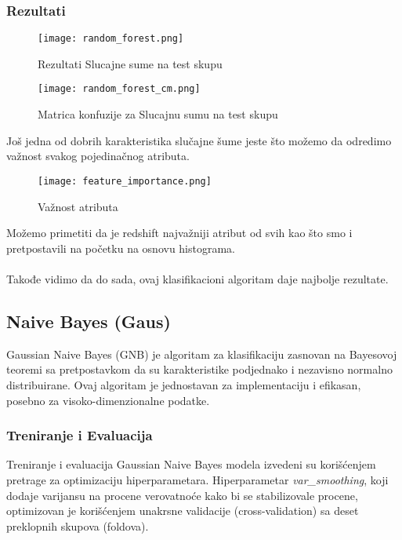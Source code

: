 \documentclass[a4paper,12pt]{article}
\begin{document}
\subsubsection{Rezultati}

\begin{figure}[H]
\centering
\texttt{[image: random\_forest.png]}
\caption{Rezultati Slucajne sume na test skupu}
\label{fig:random_forest}
\end{figure}

\begin{figure}[H]
\centering
\texttt{[image: random\_forest\_cm.png]}
\caption{Matrica konfuzije za Slucajnu sumu na test skupu}
\label{fig:random_forest_cm}
\end{figure}

Još jedna od dobrih karakteristika slučajne šume jeste što možemo da odredimo važnost svakog pojedinačnog atributa.

\begin{figure}[H]
    \centering
    \texttt{[image: feature\_importance.png]}
    \caption{Važnost atributa}
    \label{fig:feature_importance}
\end{figure}

Možemo primetiti da je redshift najvažniji atribut od svih kao što smo i pretpostavili na početku na osnovu histograma.
\\\\Takođe vidimo da do sada, ovaj klasifikacioni algoritam daje najbolje rezultate.

\subsection{Naive Bayes (Gaus)}
Gaussian Naive Bayes (GNB) je algoritam za klasifikaciju zasnovan na Bayesovoj teoremi sa pretpostavkom da su karakteristike podjednako i nezavisno normalno distribuirane. Ovaj algoritam je jednostavan za implementaciju i efikasan, posebno za visoko-dimenzionalne podatke.

\subsubsection{Treniranje i Evaluacija}
Treniranje i evaluacija Gaussian Naive Bayes modela izvedeni su korišćenjem pretrage za optimizaciju hiperparametara. Hiperparametar \textit{var\_smoothing}, koji dodaje varijansu na procene verovatnoće kako bi se stabilizovale procene, optimizovan je korišćenjem unakrsne validacije (cross-validation) sa deset preklopnih skupova (foldova).
\end{document}
